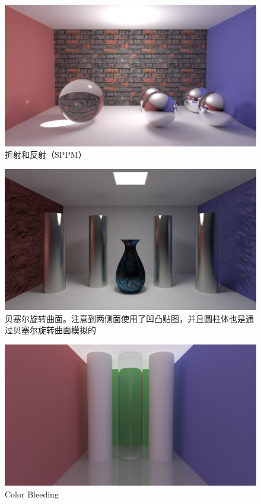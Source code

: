 \documentclass[cn]{report}
\begin{document}
    \begin{figure}[htbp]
        \centering
        \includegraphics[width=\linewidth]{../results/cornell-2ball-sppm.png}
        \caption{折射和反射（SPPM）}
        \label{fig:cornell-2ball-sppm}
    \end{figure}

    \begin{figure}[htbp]
        \centering
        \includegraphics[width=\linewidth]{../results/cornell-bezier-normal.png}
        \caption{贝塞尔旋转曲面。注意到两侧面使用了凹凸贴图，并且圆柱体也是通过贝塞尔旋转曲面模拟的}
        \label{fig:bezier}
    \end{figure}

    \begin{figure}[htbp]
        \centering
        \includegraphics[width=\linewidth]{../results/bleeding.png}
        \caption{Color Bleeding}
        \label{fig:bleeding}
    \end{figure}
\end{document}
